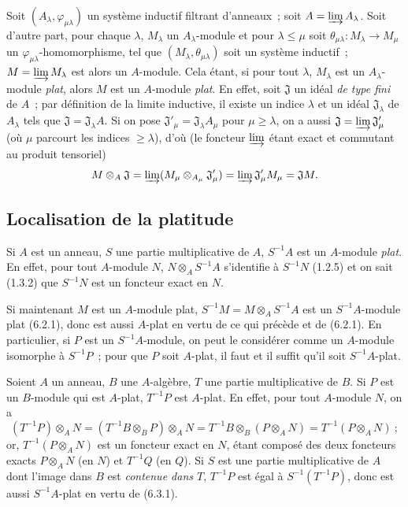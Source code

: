 \begin{env}[6.2.3]
\label{0.6.2.3-fr}
Soit $(A_\lambda,\varphi_{\mu\lambda})$ un système inductif filtrant
d'anneaux~; soit $A=\varinjlim A_\lambda$. Soit d'autre part, pour chaque
$\lambda$, $M_\lambda$ un $A_\lambda$-module et pour $\lambda\leq\mu$ soit
$\theta_{\mu\lambda}:M_\lambda\to M_\mu$ un
$\varphi_{\mu\lambda}$-homomorphisme, tel que
$(M_\lambda,\theta_{\mu\lambda})$ soit un système inductif~;
$M=\varinjlim M_\lambda$ est alors un $A$-module. Cela étant, si pour tout
$\lambda$, $M_\lambda$ est un $A_\lambda$-module \emph{plat}, alors $M$ est
un $A$-module \emph{plat}. En effet, soit $\mathfrak{J}$ un idéal \emph{de
type fini} de $A$~; par définition de la limite inductive, il existe un
indice $\lambda$ et un idéal $\mathfrak{J}_\lambda$ de $A_\lambda$ tels que
$\mathfrak{J}=\mathfrak{J}_\lambda A$. Si on pose
$\mathfrak{J}'_\mu=\mathfrak{J}_\lambda A_\mu$ pour $\mu\geq\lambda$, on a
aussi $\mathfrak{J}=\varinjlim\mathfrak{J}'_\mu$ (où $\mu$ parcourt les
indices $\geq\lambda$), d'où (le foncteur $\varinjlim$ étant exact et
commutant au produit tensoriel)
\[
  M\otimes_A\mathfrak{J}
  =\varinjlim(M_\mu\otimes_{A_\mu}\mathfrak{J}'_\mu)
  =\varinjlim\mathfrak{J}'_\mu M_\mu
  =\mathfrak{J}M.
\]
\end{env}

\subsection{Localisation de la platitude}
\label{subsection:0.6.3-fr}

\begin{env}[6.3.1]
\label{0.6.3.1-fr}
Si $A$ est un anneau, $S$ une partie multiplicative de $A$, $S^{-1}A$ est
un $A$-module \emph{plat}. En effet, pour tout $A$-module $N$,
$N\otimes_A S^{-1}A$ s'identifie à $S^{-1}N$ (1.2.5) et on sait (1.3.2)
que $S^{-1}N$ est un foncteur exact en $N$.

Si maintenant $M$ est un $A$-module plat,
$S^{-1}M=M\otimes_A S^{-1}A$ est un $S^{-1}A$-module plat (6.2.1), donc
est aussi $A$-plat en vertu de ce qui précède et de (6.2.1). En particulier,
si $P$ est un $S^{-1}A$-module, on peut le considérer comme un $A$-module
isomorphe à $S^{-1}P$~; pour que $P$ soit $A$-plat, il faut et il suffit
qu'il soit $S^{-1}A$-plat.
\end{env}

\begin{env}[6.3.2]
\label{0.6.3.2-fr}
Soient $A$ un anneau, $B$ une $A$-algèbre, $T$ une partie multiplicative de
$B$. Si $P$ est un $B$-module qui est $A$-plat, $T^{-1}P$ est $A$-plat. En
effet, pour tout $A$-module $N$, on a
\[
  (T^{-1}P)\otimes_A N
  =(T^{-1}B\otimes_B P)\otimes_A N
  =T^{-1}B\otimes_B(P\otimes_A N)
  =T^{-1}(P\otimes_A N)~;
\]
or, $T^{-1}(P\otimes_A N)$ est un foncteur exact en $N$, étant composé des
deux foncteurs exacts $P\otimes_A N$ (en $N$) et $T^{-1}Q$ (en $Q$). Si $S$
est une partie multiplicative de $A$ dont l'image dans $B$ est
\emph{contenue dans $T$}, $T^{-1}P$ est égal à $S^{-1}(T^{-1}P)$, donc est
aussi $S^{-1}A$-plat en vertu de (6.3.1).
\end{env}

